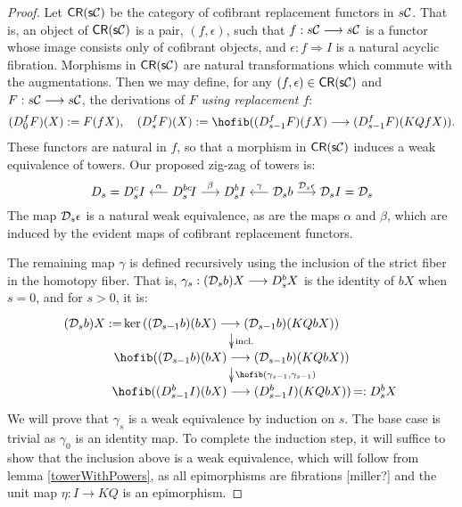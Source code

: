\documentclass[11pt]{amsart}
\theoremstyle{plain}
\begin{document}
\begin{proof}
Let $\mathsf{CR(s\mathcal{C})}$ be the category of cofibrant replacement functors in $s\mathcal{C}$. That is, an object of $\mathsf{CR(s\mathcal{C})}$ is a pair, $(f,\epsilon)$, such that $f:s\mathcal{C}\longrightarrow s\mathcal{C}$ is a functor whose image consists only of cofibrant objects, and $\epsilon:f\Rightarrow I$ is a natural acyclic fibration. Morphisms in $\mathsf{CR(s\mathcal{C})}$ are natural transformations which commute with the augmentations. Then we may define, for any $(f,\epsilon)\in\mathsf{CR(s\mathcal{C})}$ and $F:s\mathcal{C}\longrightarrow s\mathcal{C}$, the derivations of $F$ \emph{using replacement $f$}:
\begin{alignat*}{2}
(D_{\smash{0}}^{\smash{f}}F)(X)
:=
F(fX),\quad %
(D_{\smash{s}}^{\smash{f}}F)(X)
:=
\hofib((D_{\smash{s-1}}^{\smash{f}}F)(fX)\to (D_{\smash{s-1}}^{\smash{f}}F)(KQfX)).
\end{alignat*}
These functors are natural in $f$, so that a morphism in $\mathsf{CR(s\mathcal{C})}$ induces a weak equivalence of towers. Our proposed zig-zag of towers is: %
\[D_{\smash{s}}= D_{\smash{s}}^{\smash{c}}I\overset{\alpha}{\longleftarrow}D_{\smash{s}}^{\smash{b\relax c}}\!I\overset{\beta}{\longrightarrow}D_{\smash{s}}^{\smash{b}}I\overset{\gamma}{\longleftarrow}\mathcal{D}_{\smash{s}}b\overset{\mathcal{D}_{\smash{s}}\epsilon}{\longrightarrow}\mathcal{D}_{\smash{s}}I=\mathcal{D}_{\smash{s}}\]
The map $\mathcal{D}_{\smash{s}}\epsilon$ is a natural weak equivalence, as are the maps $\alpha$ and $\beta$, which are induced by the evident maps of cofibrant replacement functors. 

The remaining map $\gamma$ is defined recursively using the inclusion of the strict fiber in the homotopy fiber. That is, $\gamma_s:(\mathcal{D}_{\smash{s}}b)X\longrightarrow D_{\smash{s}}^{\smash{b}}X$ is the identity of $bX$ when $s=0$, and for $s>0$, it is:
\[\xymatrix@R=4mm{
\makebox[0cm][r]{$(\caldup{s}b)X:=\,$}\ker((\caldup{s-1}b)(bX)\to (\caldup{s-1}b)(KQbX))\ar[d]^-{\textup{incl.}}
\\%
\hofib((\caldup{s-1}b)(bX)\to(\caldup{s-1}b)(KQbX))\ar[d]^-{\hofib(\gamma_{s-1},\gamma_{s-1})}
\\%
\hofib((D_{\smash{s-1}}^{\smash{b}}I)(bX)\to (D_{\smash{s-1}}^{\smash{b}}I)(KQbX))\makebox[0cm][l]{$\,=:D_{\smash{s}}^{\smash{b}}X$}%
}\]
We will prove that $\gamma_s$ is a weak equivalence by induction on $s$. The base case is trivial as $\gamma_0$ is an identity map. To complete the induction step, it will suffice to show that the inclusion above is a weak equivalence, which will follow from lemma \ref{towerWithPowers}, as all epimorphisms are fibrations [miller?] and the unit map $\eta:I\to KQ$ is an epimorphism.
\end{proof}
\end{document}
